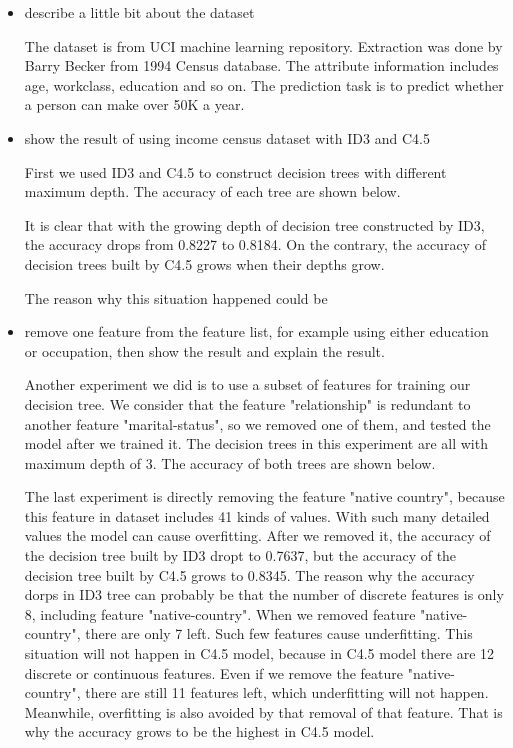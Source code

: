 \documentclass[a4paper]{article}
\begin{document}
\begin{itemize}
	\item describe a little bit about the dataset

    The dataset is from UCI machine learning repository. Extraction was done by Barry Becker from 1994 Census database. The attribute information includes age, workclass, education and so on. The prediction task is to predict whether a person can make over 50K a year.


	\item show the result of using income census dataset with ID3 and C4.5

	First we used ID3 and C4.5 to construct decision trees with different maximum depth. The accuracy of each tree are shown below.

	It is clear that with the growing depth of decision tree constructed by ID3, the accuracy drops from 0.8227 to 0.8184. On the contrary, the accuracy of decision trees built by C4.5 grows when their depths grow.

    The reason why this situation happened could be

	\item remove one feature from the feature list, for example using either education or occupation, then show the result and explain the result.

    Another experiment we did is to use a subset of features for training our decision tree. We consider that the feature "relationship" is redundant to another feature "marital-status", so we removed one of them, and tested the model after we trained it. The decision trees in this experiment are all with maximum depth of 3. The accuracy of both trees are shown below.

    The last experiment is directly removing the feature "native country", because this feature in dataset includes 41  kinds of values. With such many detailed values the model can cause overfitting. After we removed it, the accuracy of the decision tree built by ID3 dropt to 0.7637, but the accuracy of the decision tree built by C4.5 grows to 0.8345. The reason why the accuracy dorps in ID3 tree can probably be that the number of discrete features is only 8, including feature "native-country". When we removed feature "native-country", there are only 7 left. Such few features cause underfitting. This situation will not happen in C4.5 model, because in C4.5 model there are 12 discrete or continuous features. Even if we remove the feature "native-country", there are still 11 features left, which underfitting will not happen. Meanwhile, overfitting is also avoided by that removal of that feature. That is why the accuracy grows to be the highest in C4.5 model.

\end{itemize}



\end{document}
